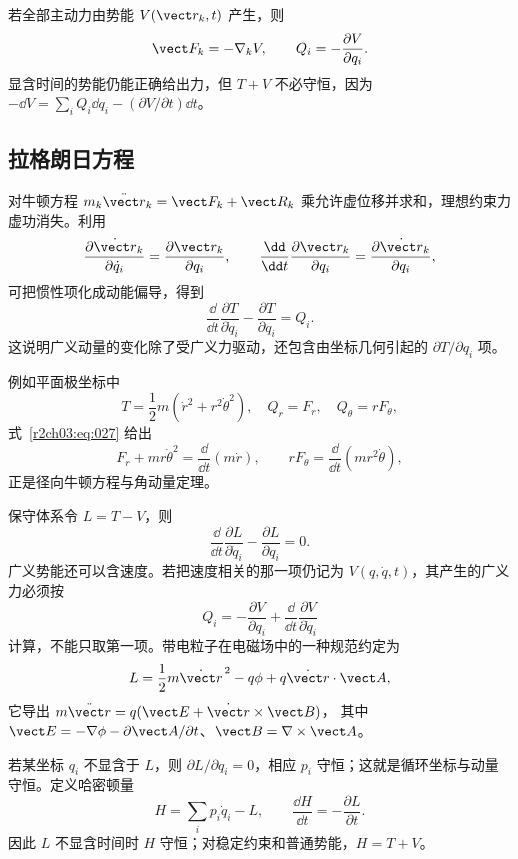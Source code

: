 若全部主动力由势能 $V(\vect r_k,t)$ 产生，则
\begin{equation}
 \vect F_k=-\nabla_kV,\qquad Q_i=-\frac{\partial V}{\partial q_i}.
 \label{r2ch03:eq:026}
\end{equation}
显含时间的势能仍能正确给出力，但 $T+V$ 不必守恒，因为
$-\dd V=\sum_iQ_i\dd q_i-(\partial V/\partial t)\dd t$。

\subsection{拉格朗日方程}

对牛顿方程
$m_k\ddot{\vect r}_k=\vect F_k+\vect R_k$ 乘允许虚位移并求和，理想约束力虚功消失。利用
\[
 \frac{\partial\dot{\vect r}_k}{\partial\dot q_i}
 =\frac{\partial\vect r_k}{\partial q_i},\qquad
 \frac{\dd}{\dd t}\frac{\partial\vect r_k}{\partial q_i}
 =\frac{\partial\dot{\vect r}_k}{\partial q_i},
\]
可把惯性项化成动能偏导，得到
\begin{equation}
 \boxed{\frac{\dd}{\dd t}\frac{\partial T}{\partial\dot q_i}
 -\frac{\partial T}{\partial q_i}=Q_i}.
 \label{r2ch03:eq:027}
\end{equation}
这说明广义动量的变化除了受广义力驱动，还包含由坐标几何引起的 $\partial T/\partial q_i$ 项。

例如平面极坐标中
\[
 T=\frac12m(\dot r^2+r^2\dot\theta^2),\quad
 Q_r=F_r,\quad Q_\theta=rF_\theta ,
\]
式~\eqref{r2ch03:eq:027} 给出
\[
 F_r+m r\dot\theta^2=\frac{\dd}{\dd t}(m\dot r),\qquad
 rF_\theta=\frac{\dd}{\dd t}(mr^2\dot\theta),
\]
正是径向牛顿方程与角动量定理。

保守体系令 $L=T-V$，则
\begin{equation}
 \boxed{\frac{\dd}{\dd t}\frac{\partial L}{\partial\dot q_i}
 -\frac{\partial L}{\partial q_i}=0}.
 \label{r2ch03:eq:028}
\end{equation}
广义势能还可以含速度。若把速度相关的那一项仍记为 $V(q,\dot q,t)$，其产生的广义力必须按
\[
 Q_i=-\frac{\partial V}{\partial q_i}
 +\frac{\dd}{\dd t}\frac{\partial V}{\partial\dot q_i}
\]
计算，不能只取第一项。带电粒子在电磁场中的一种规范约定为
\[
 L=\frac12m\dot{\vect r}^{\,2}-q\phi+q\dot{\vect r}\cdot\vect A ,
\]
它导出
$m\ddot{\vect r}=q(\vect E+\dot{\vect r}\times\vect B)$，
其中 $\vect E=-\nabla\phi-\partial\vect A/\partial t$、$\vect B=\nabla\times\vect A$。

若某坐标 $q_i$ 不显含于 $L$，则 $\partial L/\partial q_i=0$，相应 $p_i$ 守恒；这就是循环坐标与动量守恒。定义哈密顿量
\begin{equation}
 H=\sum_ip_i\dot q_i-L,\qquad
 \frac{\dd H}{\dd t}=-\frac{\partial L}{\partial t}.
 \label{r2ch03:eq:029}
\end{equation}
因此 $L$ 不显含时间时 $H$ 守恒；对稳定约束和普通势能，$H=T+V$。


